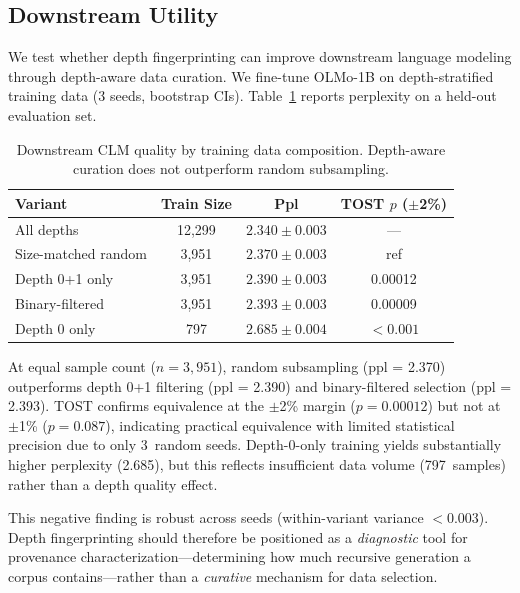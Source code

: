 \documentclass[11pt,a4paper]{article}
\begin{document}
\subsection{Downstream Utility}
\label{sec:downstream}

We test whether depth fingerprinting can improve downstream language modeling through depth-aware data curation.
We fine-tune OLMo-1B on depth-stratified training data (3 seeds, bootstrap CIs).
Table~\ref{tab:downstream} reports perplexity on a held-out evaluation set.

\begin{table}[t]
\centering
\small
\caption{Downstream CLM quality by training data composition. Depth-aware curation does not outperform random subsampling.}
\label{tab:downstream}
\begin{tabular}{lccc}
\toprule
\textbf{Variant} & \textbf{Train Size} & \textbf{Ppl} & \textbf{TOST $p$ ($\pm$2\%)} \\
\midrule
All depths & 12,299 & $2.340 \pm 0.003$ & --- \\
Size-matched random & 3,951 & $2.370 \pm 0.003$ & ref \\
Depth 0+1 only & 3,951 & $2.390 \pm 0.003$ & 0.00012 \\
Binary-filtered & 3,951 & $2.393 \pm 0.003$ & 0.00009 \\
Depth 0 only & 797 & $2.685 \pm 0.004$ & $< 0.001$ \\
\bottomrule
\end{tabular}
\end{table}

At equal sample count ($n = 3{,}951$), random subsampling (ppl = 2.370) outperforms depth 0+1 filtering (ppl = 2.390) and binary-filtered selection (ppl = 2.393).
TOST confirms equivalence at the $\pm$2\% margin ($p = 0.00012$) but not at $\pm$1\% ($p = 0.087$), indicating practical equivalence with limited statistical precision due to only 3~random seeds.
Depth-0-only training yields substantially higher perplexity (2.685), but this reflects insufficient data volume (797~samples) rather than a depth quality effect.

This negative finding is robust across seeds (within-variant variance $< 0.003$).
Depth fingerprinting should therefore be positioned as a \emph{diagnostic} tool for provenance characterization---determining how much recursive generation a corpus contains---rather than a \emph{curative} mechanism for data selection.

\end{document}
